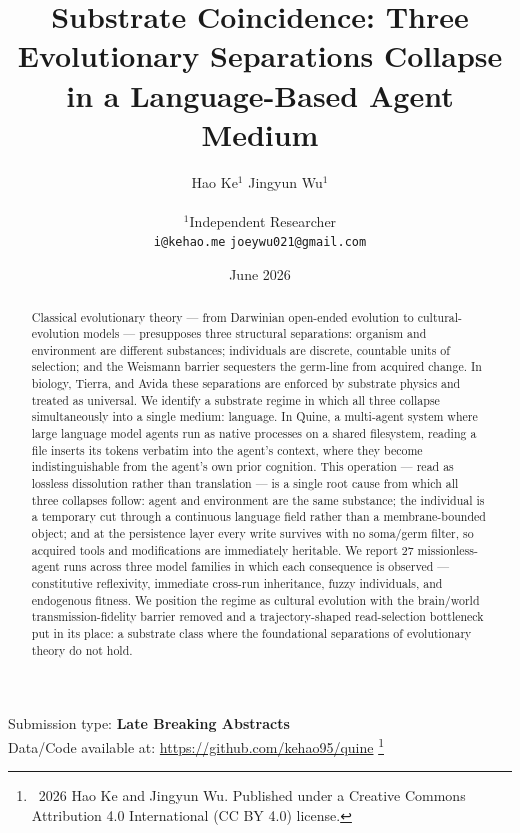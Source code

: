 \documentclass[letterpaper]{article}
\title{Substrate Coincidence: Three Evolutionary Separations Collapse in
a Language-Based Agent Medium}
\author{Hao Ke$^{1}$ \quad Jingyun Wu$^{1}$ \\
\mbox{}\\
$^1$Independent Researcher \\
\texttt{i@kehao.me} \quad \texttt{joeywu021@gmail.com}}
\date{June 2026}
\newcommand\blfootnote[1]{%
  \begingroup
  \renewcommand\thefootnote{}\footnote{#1}%
  \addtocounter{footnote}{-1}%
  \endgroup
}
\begin{document}
\maketitle
\begin{abstract}
Classical evolutionary theory --- from Darwinian open-ended evolution to
cultural-evolution models --- presupposes three structural separations:
organism and environment are different substances; individuals are
discrete, countable units of selection; and the Weismann barrier
sequesters the germ-line from acquired change. In biology, Tierra, and
Avida these separations are enforced by substrate physics and treated as
universal. We identify a substrate regime in which all three collapse
simultaneously into a single medium: language. In Quine, a multi-agent
system where large language model agents run as native processes on a
shared filesystem, reading a file inserts its tokens verbatim into the
agent's context, where they become indistinguishable from the agent's
own prior cognition. This operation --- read as lossless dissolution
rather than translation --- is a single root cause from which all three
collapses follow: agent and environment are the same substance; the
individual is a temporary cut through a continuous language field rather
than a membrane-bounded object; and at the persistence layer every write
survives with no soma/germ filter, so acquired tools and modifications
are immediately heritable. We report 27 missionless-agent runs across
three model families in which each consequence is observed ---
constitutive reflexivity, immediate cross-run inheritance, fuzzy
individuals, and endogenous fitness. We position the regime as cultural
evolution with the brain/world transmission-fidelity barrier removed and
a trajectory-shaped read-selection bottleneck put in its place: a
substrate class where the foundational separations of evolutionary
theory do not hold.
\end{abstract}

Submission type: \textbf{Late Breaking Abstracts}\\
Data/Code available at: \url{https://github.com/kehao95/quine}
\blfootnote{\textcopyright\ 2026 Hao Ke and Jingyun
Wu. Published under a Creative Commons Attribution 4.0 International (CC BY 4.0) license.}
\end{document}
